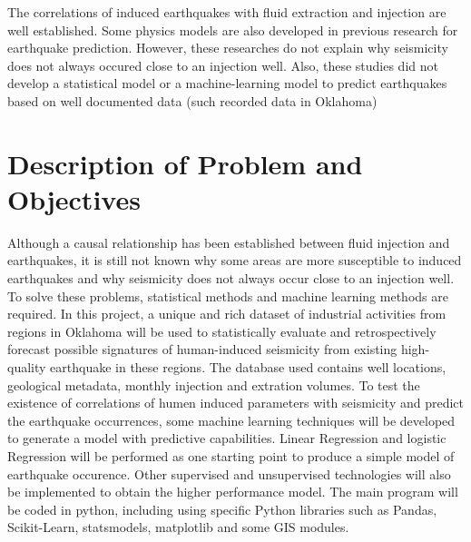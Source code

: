 \documentclass[project-plan]{report-template}
\begin{document}
The correlations of induced earthquakes with fluid extraction and injection are well established. 
Some physics models are also developed in previous research for earthquake prediction.
However, these researches do not explain why seismicity does not always occured close to an injection well.
Also, these studies did not develop a statistical model or a machine-learning model to predict earthquakes based on well documented data (such recorded data in Oklahoma)

\section{Description of Problem and Objectives}
Although a causal relationship has been established between fluid injection and earthquakes, it is still not known why some areas are more susceptible to induced earthquakes and why seismicity does not always occur close to an injection well. 
To solve these problems, statistical methods and machine learning methods are required.
In this project, a unique and rich dataset of industrial activities from regions in Oklahoma will be used to statistically evaluate and retrospectively forecast possible signatures of human-induced seismicity from existing high-quality earthquake in these regions.
The database used contains well locations, geological metadata, monthly injection and extration volumes. 
To test the existence of correlations of humen induced parameters with seismicity and predict the earthquake occurrences, some machine learning techniques will be developed to generate a model with predictive capabilities.
Linear Regression and logistic Regression will be performed as one starting point to produce a simple model of earthquake occurence. 
Other supervised and unsupervised technologies will also be implemented to obtain the higher performance model.
The main program will be coded in python, including using specific Python libraries such as Pandas, Scikit-Learn, statsmodels, matplotlib and some GIS modules.
\end{document}
